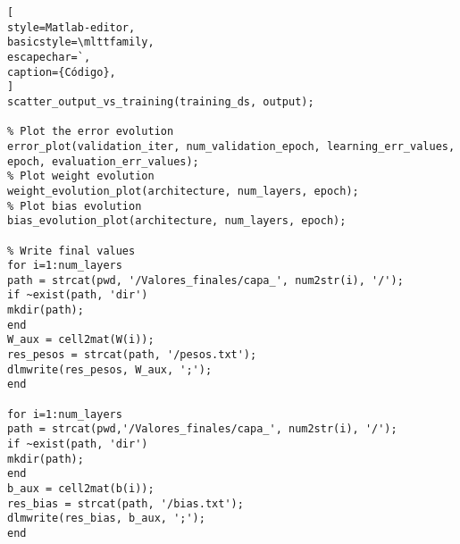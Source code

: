 \documentclass[6pt]{article}
\begin{document}
\begin{lstlisting}[
style=Matlab-editor,
basicstyle=\mlttfamily,
escapechar=`,
caption={Código},
]
scatter_output_vs_training(training_ds, output);

% Plot the error evolution
error_plot(validation_iter, num_validation_epoch, learning_err_values, epoch, evaluation_err_values);
% Plot weight evolution
weight_evolution_plot(architecture, num_layers, epoch);
% Plot bias evolution
bias_evolution_plot(architecture, num_layers, epoch);

% Write final values
for i=1:num_layers
path = strcat(pwd, '/Valores_finales/capa_', num2str(i), '/');
if ~exist(path, 'dir')
mkdir(path);
end
W_aux = cell2mat(W(i));
res_pesos = strcat(path, '/pesos.txt');
dlmwrite(res_pesos, W_aux, ';');
end

for i=1:num_layers
path = strcat(pwd,'/Valores_finales/capa_', num2str(i), '/');
if ~exist(path, 'dir')
mkdir(path);
end
b_aux = cell2mat(b(i));
res_bias = strcat(path, '/bias.txt');
dlmwrite(res_bias, b_aux, ';');
end



\end{lstlisting}
\end{document}
